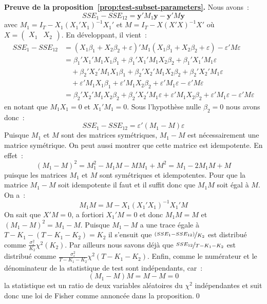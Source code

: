 \documentclass[10pt,a4paper]{article}
\theoremstyle{definition}
\begin{document}
\begin{notes}

  \textbf{Preuve de la proposition~\ref{prop:test-subset-parameters}.} Nous avons~:
  \[
    SSE_1 - SSE_{12} = \mathbf y' M_1\mathbf y - \mathbf y' M \mathbf y
  \]
  avec $M_1 = I_{T}-X_1(X_1'X_1)^{-1}X_1'$ et $M = I_{T}-X(X'X)^{-1}X'$ où  $X = \begin{pmatrix}X_1 & X_2\end{pmatrix}$. En développant, il vient~:
  \[
    \begin{split}
      SSE_1 - SSE_{12} &= \left(X_1\beta_1 + X_2\beta_2 + \varepsilon\right)'M_1\left(X_1\beta_1 + X_2\beta_2 + \varepsilon\right) - \varepsilon'M\varepsilon\\
                       &= \beta_1'X_1'M_1X_1\beta_1 + \beta_1'X_1'M_1X_2\beta_2+ \beta_1'X_1'M_1\varepsilon\\
                       &\quad + \beta_2'X_2'M_1X_1\beta_1 + \beta_2'X_2'M_1X_2\beta_2+ \beta_2'X_2'M_1\varepsilon\\
                       &\quad + \varepsilon'M_1X_1\beta_1 + \varepsilon'M_1X_2\beta_2+ \varepsilon'M_1\varepsilon - \varepsilon'M\varepsilon\\
      &= \beta_2'X_2'M_1X_2\beta_2 + \beta_2'X_2'M_1\varepsilon + \varepsilon'M_1X_2\beta_2 + \varepsilon'M_1\varepsilon - \varepsilon'M\varepsilon
    \end{split}
  \]
  en notant que $M_1X_1=0$ et $X_1'M_1 = 0$. Sous l'hypothèse nulle $\beta_2=0$ nous avons donc~:
  \[
    SSE_1 - SSE_{12} = \varepsilon'\left( M_1 - M \right)\varepsilon
  \]
  Puisque $M_1$ et $M$ sont des matrices symétriques, $M_1-M$ est nécessairement une matrice symétrique. On peut aussi montrer que cette matrice est idempotente. En effet~:
  \[
    \left( M_1-M \right)^2 = M_1^2 - M_1M - MM_1 + M^2 = M_1 - 2M_1M + M
  \]
  puisque les matrices $M_1$ et $M$ sont symétriques et idempotentes. Pour que la matrice $M_1-M$ soit idempotente il faut et il suffit donc que $M_1M$ soit égal à $M$. On a~:
  \[
    M_1M = M - X_1(X_1'X_1)^{-1}X_1'M
  \]
  On sait que $X'M=0$, a fortiori $X_1'M = 0$ et donc $M_1M=M$ et $\left(M_1-M\right)^2=M_1-M$. Puisque $M_1-M$ a une trace égale à $T-K_1-(T-K_1-K_2)=K_2$ il s'ensuit que $\nicefrac{\left(SSE_1-SSE_{12} \right)}{K_2}$ est distribué comme $\frac{\sigma_{\varepsilon}^2}{K_2}\chi^2(K_2)$. Par ailleurs nous savons déjà que $\nicefrac{SSE_{12}}{T-K_1-K_2}$ est distribué comme $\frac{\sigma_{\varepsilon}^2}{T-K_1-K_2}\chi^2(T-K_1-K_2)$. Enfin, comme le numérateur et le dénominateur de la statistique de test sont indépendants, car~:
  \[
    (M_1-M)M = M - M = 0
  \]
la statistique est un ratio de deux variables aléatoires du $\chi^2$ indépendantes et suit donc une loi de Fisher comme annoncée dans la proposition.\qed

\end{notes}
\end{document}
